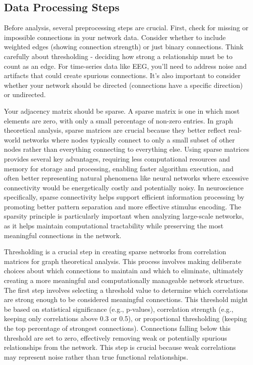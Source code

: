 \subsection*{Data Processing Steps}
Before analysis, several preprocessing steps are crucial. First, check for missing or impossible connections in your network data. Consider whether to include weighted edges (showing connection strength) or just binary connections. Think carefully about thresholding - deciding how strong a relationship must be to count as an edge. For time-series data like EEG, you'll need to address noise and artifacts that could create spurious connections. It's also important to consider whether your network should be directed (connections have a specific direction) or undirected.

Your adjacency matrix should be sparse. A sparse matrix is one in which most elements are zero, with only a small percentage of non-zero entries. In graph theoretical analysis, sparse matrices are crucial because they better reflect real-world networks where nodes typically connect to only a small subset of other nodes rather than everything connecting to everything else. Using sparse matrices provides several key advantages, requiring less computational resources and memory for storage and processing, enabling faster algorithm execution, and often better representing natural phenomena like neural networks where excessive connectivity would be energetically costly and potentially noisy. In neuroscience specifically, sparse connectivity helps support efficient information processing by promoting better pattern separation and more effective stimulus encoding. The sparsity principle is particularly important when analyzing large-scale networks, as it helps maintain computational tractability while preserving the most meaningful connections in the network.


Thresholding is a crucial step in creating sparse networks from correlation matrices for graph theoretical analysis. This process involves making deliberate choices about which connections to maintain and which to eliminate, ultimately creating a more meaningful and computationally manageable network structure.
The first step involves selecting a threshold value to determine which correlations are strong enough to be considered meaningful connections. This threshold might be based on statistical significance (e.g., p-values), correlation strength (e.g., keeping only correlations above 0.3 or 0.5), or proportional thresholding (keeping the top percentage of strongest connections). Connections falling below this threshold are set to zero, effectively removing weak or potentially spurious relationships from the network. This step is crucial because weak correlations may represent noise rather than true functional relationships.

